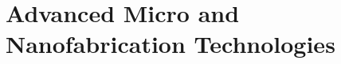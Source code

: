 \documentclass[
11pt, %
fleqn, %
a4paper, %
]{LegrandOrangeBook}
\begin{document}
	
	
	
	
	
	
	
	
	
	\pagestyle{empty} %
	
	\tableofcontents %
	
	
	
	\pagestyle{fancy} %
	
	
	
	\part{Advanced Micro and Nanofabrication Technologies}
	
	
	
\end{document}
